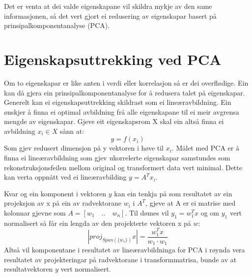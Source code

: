 \documentclass[oneside, nynorsk]{book}
\begin{document}
Det er venta at dei valde eigenskapane vil skildra mykje av den same informasjonen, så det vert gjort ei redusering av eigenskapar basert på prinsipalkomponentanalyse (PCA).
\newpage
\section{Eigenskapsuttrekking ved PCA}
Om to eigenskapar er like anten i verdi eller korrelasjon så er dei overflødige. Ein kan då gjera ein prinsipalkomponentanalyse for å redusera talet på
eigenskapar. %
Generelt kan ei eigenskapsuttrekking skildrast som ei lineæravbildning. Ein ønskjer å finna ei optimal avbildning frå alle eigenskapane
til ei meir avgrensa mengde av eigenskapar.
Gjeve eit eigenskapsrom X skal ein altså finna ei avbildning $x_i \in X$ sånn at:
\[y=f(x_i)\]
Som gjev redusert dimensjon på y vektoren i høve til $x_i$.
Målet med PCA er å finna ei lineæravbildning
som gjev ukorrelerte eigenskapar samstundes som rekonstruksjonsfeilen mellom original og transformert data vert minimal.
Dette kan verta oppnått ved ei lineæravbilding $y=A^Tx_i$. %

Kvar og ein komponent i vektoren $y$ kan ein tenkja på som resultatet av ein projeksjon av x på ein av radvektorane $w_i$ i $A^T$, gjeve at
A er ei matrise med kolonnar gjevne som $A=[w_1 \quad .. \quad w_n]$.
Til dømes vil $y_1=w_1^Tx$ og om $y_1$ vert normalisert så får ein lengda av den projekterte vektoren x på $w$:
\[|proj_{Span(\{w_1\})}x|=\frac{w_1^Tx}{w_1 \cdot w_1}\]
Altså vil komponentane i resultatet av lineæravbildninga for PCA i røynda vera resultatet av projekteringar
på radvektorane i transformmatrisa, bunde av at resultatvektoren $y$ vert normalisert.
\end{document}
